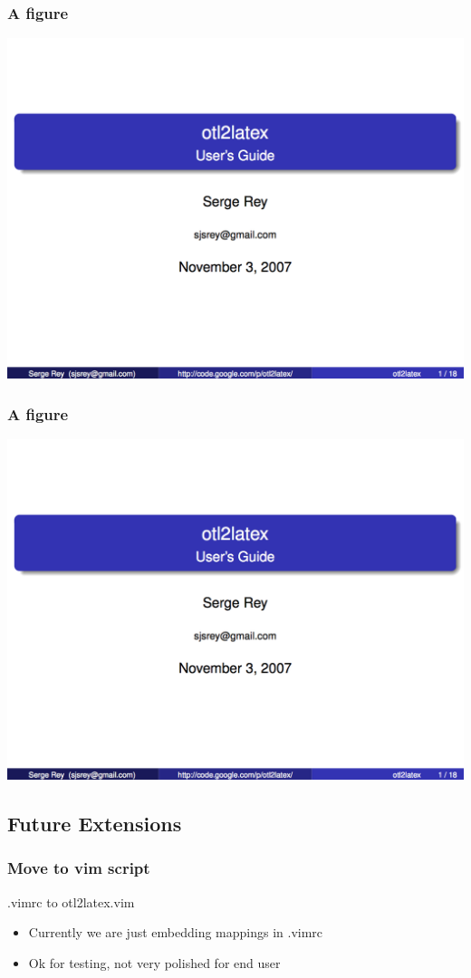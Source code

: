 \documentclass[nototal,handout]{beamer}
\begin{document}
\begin{frame}
	\frametitle{A figure}
  \begin{center}
 	\includegraphics[width=.8\linewidth]{otl2latex.png}
   \end{center}
 \end{frame} 

\begin{frame}
	\frametitle{A figure}
 \begin{center}
 \includegraphics[width=.8\linewidth]{otl2latex.png}
 \end{center}
 \end{frame} 

\subsection{Future Extensions} 

\begin{frame}
	\frametitle{Move to vim script}
 
\begin{block}{.vimrc to otl2latex.vim}
 \begin{itemize}
 \item Currently we are just embedding mappings in .vimrc
 \item Ok for testing, not very polished for end user
 \end{itemize}
 \end{block} \end{frame} 
\end{document}
